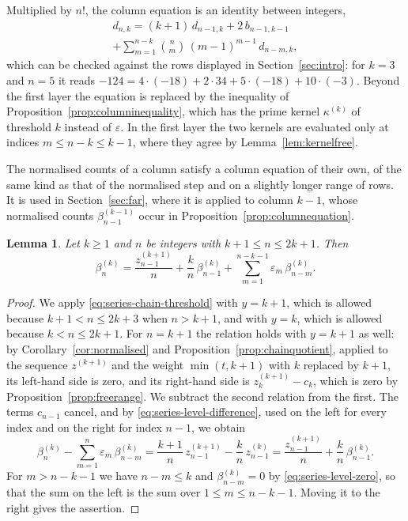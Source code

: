 \documentclass{amsart}
\newtheorem{lemma}[theorem]{Lemma}
\theoremstyle{definition}
\theoremstyle{remark}
\numberwithin{equation}{section}
\begin{document}
Multiplied by $n!$, the column equation is an identity between integers,
\begin{multline*}
d_{n,k}=(k+1)\,d_{n-1,k}+2\,b_{n-1,k-1}\\
+\sum_{m=1}^{n-k}\binom nm\,(m-1)^{m-1}\,d_{n-m,k} ,
\end{multline*}
which can be checked against the rows displayed in Section~\ref{sec:intro}:
for $k=3$ and $n=5$ it reads
$-124=4\cdot(-18)+2\cdot34+5\cdot(-18)+10\cdot(-3)$. Beyond the first
layer the equation is replaced by the inequality of
Proposition~\ref{prop:columninequality}, which has the prime kernel
$\kappa^{(k)}$ of threshold $k$ instead of $\varepsilon$. In the
first layer the two kernels are evaluated only at indices
$m\le n-k\le k-1$, where they agree by Lemma~\ref{lem:kernelfree}.

The normalised counts of a column satisfy a column equation of their own, of
the same kind as that of the normalised step and on a slightly longer range
of rows. It is used in Section~\ref{sec:far}, where it is applied to
column $k-1$, whose normalised counts
$\beta^{(k-1)}_{n-1}$ occur in Proposition~\ref{prop:columnequation}.

\begin{lemma}\label{lem:levelequation}
Let $k\ge1$ and $n$ be integers with $k+1\le n\le2k+1$. Then
\[
\beta^{(k)}_n=\frac{z^{(k+1)}_{n-1}}{n}
+\frac{k}{n}\,\beta^{(k)}_{n-1}
+\sum_{m=1}^{n-k-1}\varepsilon_m\,\beta^{(k)}_{n-m} .
\]
\end{lemma}

\begin{proof}
We apply \eqref{eq:series-chain-threshold} with $y=k+1$, which is allowed
because $k+1<n\le2k+3$ when $n>k+1$, and with $y=k$, which is allowed because
$k<n\le2k+1$. For $n=k+1$ the relation holds with $y=k+1$ as well: by
Corollary~\ref{cor:normalised} and Proposition~\ref{prop:chainquotient},
applied to the sequence $z^{(k+1)}$ and the weight $\min(t,k+1)$ with $k$
replaced by $k+1$, its left-hand side is zero, and its right-hand side is
$z^{(k+1)}_k-c_k$, which is zero by Proposition~\ref{prop:freerange}. We
subtract the second relation from the first. The
terms $c_{n-1}$ cancel, and by \eqref{eq:series-level-difference}, used on
the left for every index and on the right for index $n-1$, we obtain
\[
\beta^{(k)}_n-\sum_{m=1}^{n}\varepsilon_m\,\beta^{(k)}_{n-m}
=\frac{k+1}{n}\,z^{(k+1)}_{n-1}-\frac{k}{n}\,z^{(k)}_{n-1}
=\frac{z^{(k+1)}_{n-1}}{n}+\frac{k}{n}\,\beta^{(k)}_{n-1} .
\]
For $m>n-k-1$ we have $n-m\le k$ and $\beta^{(k)}_{n-m}=0$ by
\eqref{eq:series-level-zero}, so that the sum on the left is the sum over
$1\le m\le n-k-1$. Moving it to the right gives the assertion.
\end{proof}
\end{document}
